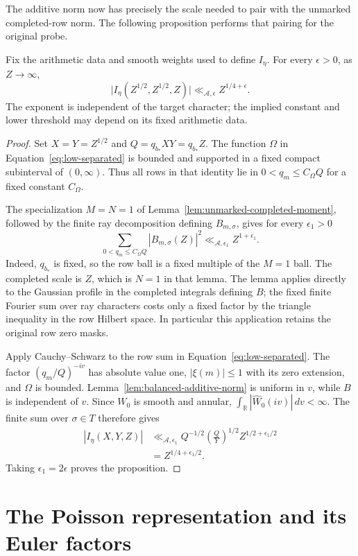 The additive norm now has precisely the scale needed to pair with the
unmarked completed-row norm.  The following proposition performs that
pairing for the original probe.

\begin{proposition}
\label{prop:balanced-low}
Fix the arithmetic data and smooth weights used to define $I_\eta$.
For every $\epsilon>0$, as $Z\to\infty$,
\[
 \bigl|I_\eta(Z^{1/2},Z^{1/2},Z)\bigr|
 \ll_{\mathcal A,\epsilon} Z^{1/4+\epsilon}.
\]
The exponent is independent of the target character; the implied constant
and lower threshold may depend on its fixed arithmetic data.
\end{proposition}

\begin{proof}
Set $X=Y=Z^{1/2}$ and $Q=q_{b_*}XY=q_{b_*}Z$.  The function $\Omega$ in
Equation~\eqref{eq:low-separated} is bounded and supported in a fixed
compact subinterval of $(0,\infty)$.  Thus all rows in that identity lie
in $0<q_m\le C_\Omega Q$ for a fixed constant $C_\Omega$.

The specialization $M=N=1$ of
Lemma~\ref{lem:unmarked-completed-moment}, followed by the finite ray
decomposition defining $B_{m,\sigma}$, gives for every $\epsilon_1>0$
\[
 \sum_{0<q_m\le C_\Omega Q}|B_{m,\sigma}(Z)|^2
 \ll_{\mathcal A,\epsilon_1} Z^{1+\epsilon_1}.
\]
Indeed, $q_{b_*}$ is fixed, so the row ball is a fixed multiple of the
$M=1$ ball.  The completed scale is $Z$, which is $N=1$ in that lemma.
The lemma applies directly to the Gaussian profile in the
completed integrals defining $B$;
the fixed finite Fourier sum over ray characters costs only a fixed factor
by the triangle inequality in the row Hilbert space.  In particular this
application retains the original row zero masks.

Apply Cauchy--Schwarz to the row sum in
Equation~\eqref{eq:low-separated}.  The factor $(q_m/Q)^{-iv}$ has absolute
value one, $|\xi(m)|\le1$ with its zero extension, and $\Omega$ is bounded.
Lemma~\ref{lem:balanced-additive-norm} is uniform in $v$, while $B$ is
independent of $v$.  Since $W_0$ is smooth and annular,
$\int_{\mathbb R}|\widehat W_0(iv)|\,dv<\infty$.  The finite sum over
$\sigma\in T$ therefore gives
\[
 \begin{split}
 |I_\eta(X,Y,Z)|
 &\ll_{\mathcal A,\epsilon_1}
 Q^{-1/2}\left(\frac QY\right)^{1/2}Z^{1/2+\epsilon_1/2}\\
 &=Z^{1/4+\epsilon_1/2}.
 \end{split}
\]
Taking $\epsilon_1=2\epsilon$ proves the proposition.
\end{proof}

\section{The Poisson representation and its Euler factors}
